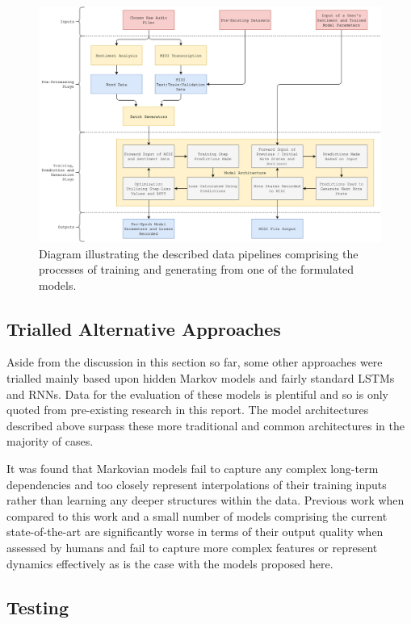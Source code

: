 \documentclass[12pt,]{article}
\begin{document}
\begin{figure}
\centering
\includegraphics{Images/processdiagram.png}
\caption{Diagram illustrating the described data pipelines comprising
the processes of training and generating from one of the formulated
models.}
\end{figure}

\hypertarget{trialled-alternative-approaches}{%
\subsection{Trialled Alternative
Approaches}\label{trialled-alternative-approaches}}

Aside from the discussion in this section so far, some other approaches
were trialled mainly based upon hidden Markov models and fairly standard
LSTMs and RNNs. Data for the evaluation of these models is plentiful and
so is only quoted from pre-existing research in this report. The model
architectures described above surpass these more traditional and common
architectures in the majority of cases.

It was found that Markovian models fail to capture any complex long-term
dependencies and too closely represent interpolations of their training
inputs rather than learning any deeper structures within the data.
Previous work when compared to this work and a small number of models
comprising the current state-of-the-art are significantly worse in terms
of their output quality when assessed by humans and fail to capture more
complex features or represent dynamics effectively as is the case with
the models proposed here.

\hypertarget{testing}{%
\subsection{Testing}\label{testing}}
\end{document}
